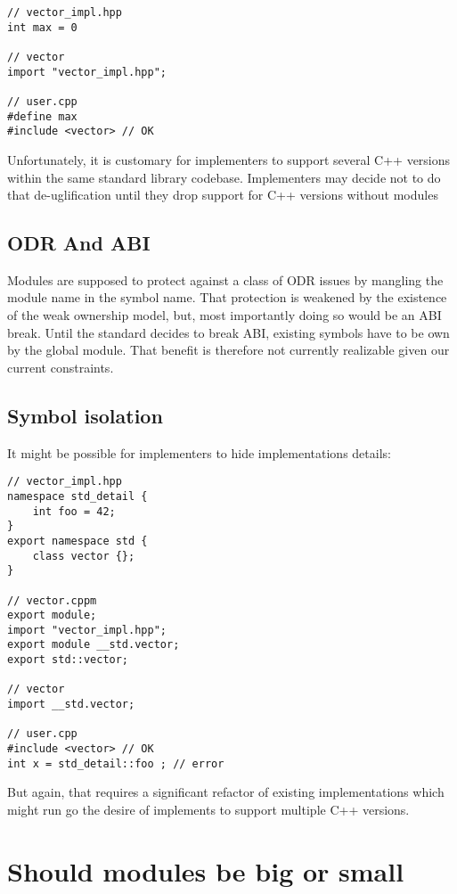\documentclass{wg21}
\begin{document}
\begin{lstlisting}[style=color]
// vector_impl.hpp
int max = 0

// vector
import "vector_impl.hpp";

// user.cpp
#define max
#include <vector> // OK
\end{lstlisting}

Unfortunately, it is customary for implementers to support several C++ versions
within the same standard library codebase.
Implementers may decide not to do that de-uglification until they drop support for C++  versions without modules


\subsection{ODR And ABI}

Modules are supposed to protect against a class of ODR issues by mangling the module name in the symbol name.
That protection is weakened by the existence of the weak ownership model, but, most importantly doing so would be an ABI break.
Until the standard decides to break ABI, existing symbols have to be own by the global module.
That benefit is therefore not currently realizable given our current constraints.


\subsection{Symbol isolation}

It might be possible for implementers to hide implementations details:

\begin{lstlisting}[style=color]
// vector_impl.hpp
namespace std_detail {
    int foo = 42;
}
export namespace std {
    class vector {};
}

// vector.cppm
export module;
import "vector_impl.hpp";
export module __std.vector;
export std::vector;

// vector
import __std.vector;

// user.cpp
#include <vector> // OK
int x = std_detail::foo ; // error
\end{lstlisting}

But again, that requires a significant refactor of existing implementations which might run go the desire of
implements to support multiple C++ versions.


\section{Should modules be big or small}
\end{document}
